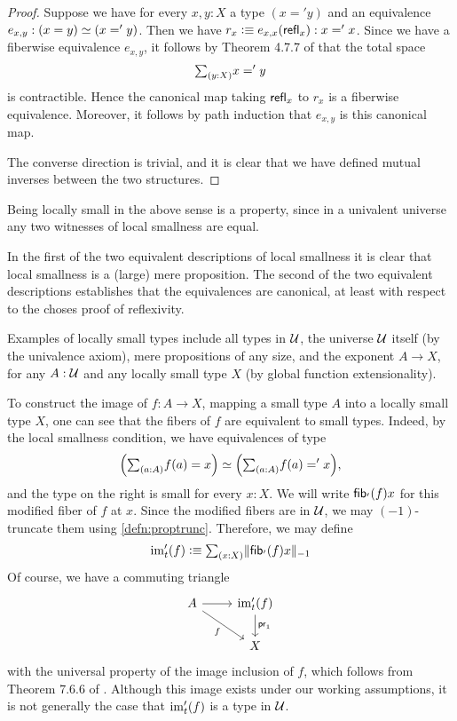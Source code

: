 \begin{proof}
Suppose we have for every $x,y:X$ a type $(x='y)$ and an equivalence $e_{x,y}:\eqv{(x=y)}{(x='y)}$. Then we have $r_x\vcentcolon\equiv e_{x,x}(\mathsf{refl}_{x}):x='x$. Since we have a fiberwise equivalence $e_{x,y}$, it follows by Theorem 4.7.7 of \cite{hottbook} that the total space
\begin{equation*}
\sm{y:X}x='y
\end{equation*}
is contractible. Hence the canonical map taking $\mathsf{refl}_{x}$ to $r_x$ is a fiberwise equivalence. Moreover, it follows by path induction that $e_{x,y}$ is this canonical map.

The converse direction is trivial, and it is clear that we have defined mutual inverses between the two structures.
\end{proof}

\begin{rmk}
Being locally small in the above sense is a property, since in a univalent universe
any two witnesses of local smallness are equal.

In the first of the two equivalent descriptions of local smallness it is clear that local smallness is a (large) mere proposition. The second of the two equivalent descriptions establishes that the equivalences are canonical, at least with respect to the choses proof of reflexivity.
\end{rmk}

\begin{eg}
Examples of locally small types include all types in $\mathcal{U}$, 
the universe $\mathcal{U}$ itself (by the univalence axiom), 
mere propositions of any size, 
and the exponent $A\to X$, for any $A:\mathcal{U}$ and any locally small type $X$
(by global function extensionality).
\end{eg}

To construct the image of $f:A\to X$, mapping a small type $A$ into a locally
small type $X$, one can see that
the fibers of $f$ are equivalent to small types. Indeed, by the
local smallness condition, we have equivalences of type
\begin{equation*}
\eqv{\Big(\sm{a:A} f(a)=x\Big)}{\Big(\sm{a:A} f(a) =' x\Big)},
\end{equation*}
and the type on the right is small for every $x:X$. We will write
$\mathsf{fib}_{'}(f){x}$ for this modified fiber of $f$ at $x$. Since the modified fibers
are in $\mathcal{U}$, we may $(-1)$-truncate them using \autoref{defn:proptrunc}. Therefore, we may define
\begin{equation}\label{eq:im_by_trunc}
\im'_t(f)\defeq\sm{x:X}\trunc{-1}{\fib'{f}{x}} 
\end{equation}
Of course, we have a commuting triangle
\begin{equation*}
\begin{tikzcd}
A \arrow[r] \arrow[dr,swap,"f"] & \im'_t(f) \arrow[d,"\proj 1"] \\
& X
\end{tikzcd}
\end{equation*}
with the universal property of the image inclusion of $f$, which follows from
Theorem 7.6.6 of \cite{hottbook}. 
Although this image exists under our working assumptions, 
it is not generally the case that $\operatorname{im}'_t(f)$ is a type in $\mathcal{U}$.

